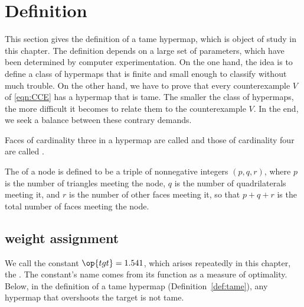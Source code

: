 \section{Definition}

This section gives the definition of a tame hypermap, which is object of study in
this chapter.    The definition depends on a large set of parameters, which have
been determined by computer experimentation.  On the one hand, the idea is to define a class
of hypermaps that is finite and small enough to classify without much trouble.
On the other hand, we have to prove that every counterexample $V$ of \eqref{eqn:CCE}
has a hypermap that is tame.  The smaller the class of hypermaps, the more difficult
it becomes to relate them to the counterexample $V$.  In the end, we seek a balance
between these contrary demands.


\begin{definition}
  Faces of cardinality three in a hypermap are called
   and those of cardinality four are called
  .
%
%
%
%
\end{definition}

\begin{definition}[type,~$(p,q,r)$]\label{definition:type}
The  of a node is defined to be a triple of
nonnegative integers $(p,q,r)$, where $p$ is the number of
triangles meeting the node, $q$ is the number of quadrilaterals
meeting it, and $r$ is the number of other faces meeting it, so that
$p+q+r$ is the total number of faces meeting the node.
%
%
%
\end{definition}


\subsection{weight assignment}\label{sec:wtassign}
%

We call the constant $\op{tgt}=1.541$, which arises repeatedly in this
chapter, the .  The constant's name comes from its
function as a measure of optimality. Below, in the definition of a tame
hypermap (Definition~\ref{def:tame}), any hypermap that overshoots the
target is not tame.  
%
%
%


